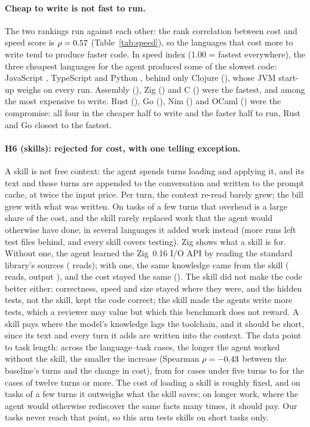 \documentclass[11pt,a4paper]{article}
\begin{document}
\paragraph{Cheap to write is not fast to run.} The two rankings run against each other: the rank
correlation between cost and speed score is $\rho = 0.57$ (Table~\ref{tab:speed}), so the
languages that cost more to write tend to produce faster code. In speed index (1.00 = fastest
everywhere), the three cheapest languages for the agent produced some of the slowest code: JavaScript
\SpeedJs, TypeScript \SpeedTs{} and Python \SpeedPython, behind only Clojure (\SpeedClojure), whose JVM
start-up weighs on every run. Assembly (\SpeedAsm), Zig (\SpeedZig) and C (\SpeedC) were the fastest,
and among the most expensive to write. Rust (\SpeedRust), Go (\SpeedGo), Nim (\SpeedNim) and OCaml
(\SpeedOcaml) were the compromise: all four in the cheaper half to write and the faster half to run, Rust
and Go closest to the fastest.

\paragraph{H6 (skills): rejected for cost, with one telling exception.} A skill is not free context: the
agent spends turns loading and applying it, and its text and those turns are appended to the conversation
and written to the prompt cache, at twice the input price. Per turn, the context re-read barely grew; the
bill grew with what was written. On tasks of a few turns that overhead is a large share of the cost, and
the skill rarely replaced work that the agent would otherwise have done; in several languages it added
work instead (more runs left test files behind, and every skill covers testing). Zig shows what a skill is for.
Without one, the agent learned the Zig~0.16 I/O API by reading the standard library's sources
(\ZigStdBase{} reads); with one, the same knowledge came from the skill (\ZigStdArm{} reads, output
\ZigOutPct), and the cost stayed the same (\SkillDeltaZig). The skill did not make the code better either: correctness, speed and size stayed
where they were, and the hidden tests, not the skill, kept the code correct; the skill made the agents
write more tests, which a reviewer may value but which this benchmark does not reward. A skill pays where
the model's knowledge lags the toolchain, and it should be short, since its text and every turn it adds are written into the context. The data point to task length: across the
language--task cases, the longer the agent worked without the skill, the smaller the increase (Spearman
$\rho = -0.43$ between the baseline's turns and the change in cost), from \SkillLenShort{} for
cases under five turns to \SkillLenLong{} for the \SkillLenLongN{} cases of twelve turns or more. The cost
of loading a skill is roughly fixed, and on tasks of a few turns it outweighs what the skill saves; on
longer work, where the agent would otherwise rediscover the same facts many times, it should pay. Our
tasks never reach that point, so this arm tests skills on short tasks only.
\end{document}

